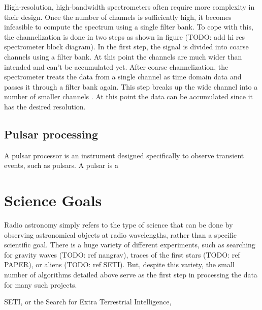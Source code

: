High-resolution, high-bandwidth spectrometers often require more complexity in their design. Once the number of channels is sufficiently high, it becomes infeasible to compute the spectrum using a single filter bank. To cope with this, the channelization is done in two steps as shown in figure (TODO: add hi res spectrometer block diagram). In the first step, the signal is divided into coarse channels using a filter bank. At this point the channels are much wider than intended and can't be accumulated yet. After coarse channelization, the spectrometer treats the data from a single channel as time domain data and passes it through a filter bank again. This step breaks up the wide channel into a number of smaller channels . At this point the data can be accumulated since it has the desired resolution.

\subsection{Pulsar processing}
A pulsar processor is an instrument designed specifically to observe transient events, such as pulsars. A pulsar is a 
%

\section{Science Goals}
Radio astronomy simply refers to the type of science that can be done by observing astronomical objects at radio wavelengths, rather than a specific scientific goal. 
There is a huge variety of different experiments, such as searching for gravity waves (TODO: ref nangrav), traces of the first stars (TODO: ref PAPER), or aliens (TODO: ref SETI).
But, despite this variety, the small number of algorithms detailed above serve as the first step in processing the data for many such projects.

SETI, or the Search for Extra Terrestrial Intelligence, 


